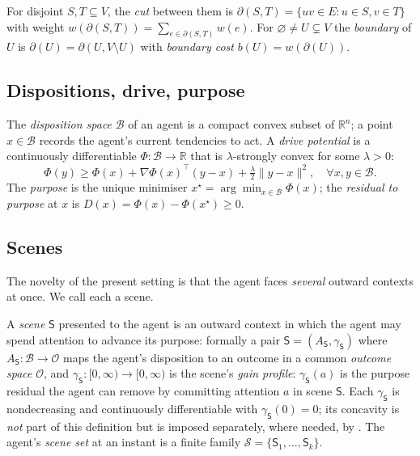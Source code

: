 \documentclass[11pt,twocolumn,a4paper]{article}
\newcommand{\R}{\mathbb{R}}
\newcommand{\V}{V}
\newcommand{\E}{E}
\newcommand{\wt}{w}
\newcommand{\cut}{\partial}
\newcommand{\Beh}{\mathcal{B}}       %
\newcommand{\drive}{\Phi}            %
\newcommand{\lam}{\lambda}
\newcommand{\Purp}{x^{\star}}        %
\newcommand{\Scene}{\mathsf{S}}      %
\newcommand{\scenes}{\mathcal{S}}    %
\newcommand{\Out}{\mathcal{O}}       %
\newcommand{\norm}[1]{\lVert#1\rVert}
\begin{document}
\begin{definition}
\label{def:cut}
For disjoint $S,T\subseteq\V$, the \emph{cut} between them is
$\cut(S,T)=\{uv\in\E:u\in S,v\in T\}$ with weight
$\wt(\cut(S,T))=\sum_{e\in\cut(S,T)}\wt(e)$. For $\varnothing\neq
U\subsetneq\V$ the \emph{boundary} of $U$ is $\cut(U)=\cut(U,\V\setminus
U)$ with \emph{boundary cost} $b(U)=\wt(\cut(U))$.
\end{definition}

\subsection{Dispositions, drive, purpose}

\begin{definition}
\label{def:disp}
The \emph{disposition space} $\Beh$ of an agent is a compact convex subset
of $\R^n$; a point $x\in\Beh$ records the agent's current tendencies to
act. A \emph{drive potential} is a continuously differentiable
$\drive:\Beh\to\R$ that is $\lam$-strongly convex for some $\lam>0$:
\[
\drive(y)\ge\drive(x)+\nabla\drive(x)^\top(y-x)
+\tfrac{\lam}{2}\norm{y-x}^2,\quad\forall x,y\in\Beh.
\]
The \emph{purpose} is the unique minimiser $\Purp=\arg\min_{x\in\Beh}
\drive(x)$; the \emph{residual to purpose} at $x$ is
$D(x)=\drive(x)-\drive(\Purp)\ge0$.
\end{definition}

\subsection{Scenes}

The novelty of the present setting is that the agent faces \emph{several}
outward contexts at once. We call each a scene.

\begin{definition}
\label{def:scene}
A \emph{scene} $\Scene$ presented to the agent is an outward context in
which the agent may spend attention to advance its purpose: formally a
pair $\Scene=(A_\Scene,\gamma_\Scene)$ where $A_\Scene:\Beh\to\Out$ maps
the agent's disposition to an outcome in a common \emph{outcome space}
$\Out$, and $\gamma_\Scene:[0,\infty)\to[0,\infty)$ is the scene's
\emph{gain profile}: $\gamma_\Scene(a)$ is the purpose residual the agent
can remove by committing attention $a$ in scene $\Scene$. Each
$\gamma_\Scene$ is nondecreasing and continuously differentiable with
$\gamma_\Scene(0)=0$; its concavity is \emph{not} part of this definition
but is imposed separately, where needed, by . The agent's
\emph{scene set} at an instant is a finite family
$\scenes=\{\Scene_1,\dots,\Scene_k\}$.
\end{definition}
\end{document}
